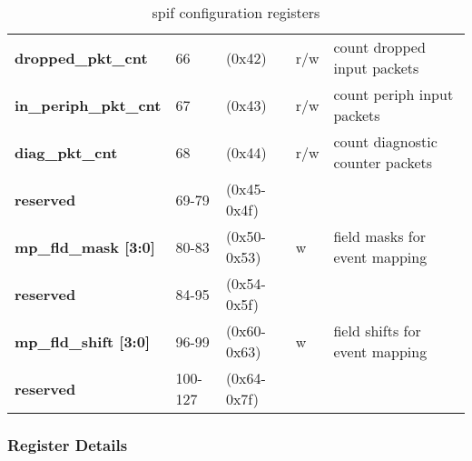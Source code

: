 \documentclass[11pt,a4paper,twoside]{article}
\begin{document}
\begin{center}
\begin{table}[!h]
\begin{tabularx}{\textwidth}{| p{34mm} p{13mm} p{21mm} p{7mm} X |}
		\textbf{dropped\_pkt\_cnt}           & 66                         & (0x42)                         & r/w                 & count dropped input packets \\%
		\textbf{in\_periph\_pkt\_cnt}        & 67                         & (0x43)                         & r/w                 & count periph input packets\\%
		\textbf{diag\_pkt\_cnt}              & 68                         & (0x44)                         & r/w                 & count diagnostic counter packets \\%
		\cellcolor{gray!25}\textbf{reserved} & \cellcolor{gray!25}69-79   & \cellcolor{gray!25}(0x45-0x4f) & \cellcolor{gray!25} & \cellcolor{gray!25}\\%
		\textbf{mp\_fld\_mask [3:0]}         & 80-83                      & (0x50-0x53)                    & w                   & field masks for event mapping \\%
		\cellcolor{gray!25}\textbf{reserved} & \cellcolor{gray!25}84-95   & \cellcolor{gray!25}(0x54-0x5f) & \cellcolor{gray!25} & \cellcolor{gray!25}\\%
		\textbf{mp\_fld\_shift [3:0]}        & 96-99                      & (0x60-0x63)                    & w                   & field shifts for event mapping  \\%
		\cellcolor{gray!25}\textbf{reserved} & \cellcolor{gray!25}100-127 & \cellcolor{gray!25}(0x64-0x7f) & \cellcolor{gray!25} & \cellcolor{gray!25}\\%
		\hline
	\end{tabularx}
	\caption{spif configuration registers}
	\label{tab:spif_regs}
\end{table}
\end{center}


\subsubsection*{Register Details}
\end{document}
